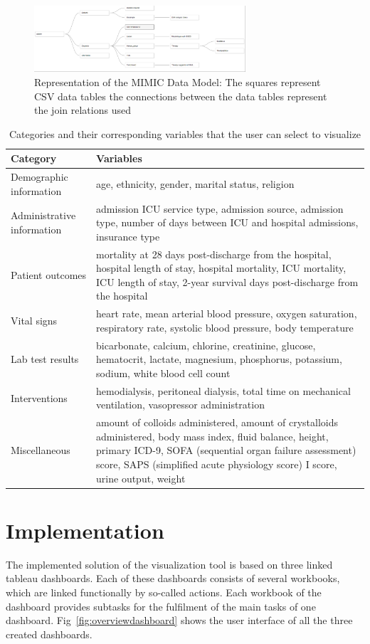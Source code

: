 \documentclass[aac,crcready]{iosart2x}
\begin{document}
\begin{figure}[ht]
\includegraphics[width=0.7\textwidth]{images/datamodel_1.png}
\caption{Representation of the MIMIC Data Model: The squares represent CSV data tables the connections between the data tables represent the join relations used}\label{f1}
\end{figure}

\begin{table}
\centering
\caption{Categories and their corresponding variables that the user can select to visualize}\label{t1}
\begin{tabular}{@{}ll@{}}
\hline
Category& Variables\\
\hline
Demographic information & age, ethnicity, gender, marital status, religion\\
Administrative information & admission ICU service type, admission source, admission type, number of days between ICU and hospital admissions, insurance type  \\
Patient outcomes & mortality at 28 days post-discharge from the hospital, hospital length of stay, hospital mortality, ICU mortality, ICU length of stay, 2-year survival days post-discharge from the hospital\\
Vital signs & heart rate, mean arterial blood pressure, oxygen saturation, respiratory rate, systolic blood pressure, body temperature \\
Lab test results & bicarbonate, calcium, chlorine, creatinine, glucose, hematocrit, lactate, magnesium, phosphorus, potassium, sodium, white blood cell count \\
Interventions & hemodialysis, peritoneal dialysis, total time on mechanical ventilation, vasopressor administration\\
Miscellaneous & amount of colloids administered, amount of crystalloids administered, body mass index, fluid balance, height, primary ICD-9, SOFA (sequential organ failure assessment) score, SAPS (simplified acute physiology score) I score, urine output, weight
\hline
\end{tabular}
\end{table}

\section{Implementation}\label{s4}
%
The implemented solution of the visualization tool is based on three linked tableau dashboards. Each of these dashboards consists of several workbooks, which are linked functionally by so-called actions. Each workbook of the dashboard provides subtasks for the fulfilment of the main tasks of one dashboard. Fig~\ref{fig:overviewdashboard} shows the user interface of all the three created dashboards.
\end{document}
